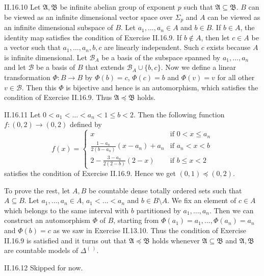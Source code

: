 \documentclass[12pt]{article}
\begin{document}
\begin{customthm}{II.16.10}
  Let $\mathfrak{A},\mathfrak{B}$ be infinite abelian group of exponent $p$ such that $\mathfrak{A}\subseteq\mathfrak{B}$. $B$ can be viewed as an infinite dimensional vector space over $\Sigma_p$ and $A$ can be viewed as an infinite dimensional subspace of $B$. Let $a_1,\ldots,a_n\in A$ and $b\in B$. If $b\in A$, the identity map satisfies the condition of Exercise II.16.9. If $b\not\in A$, then let $c\in A$ be a vector such that $a_1,\ldots,a_n,b,c$ are linearly independent. Such $c$ exists because $A$ is infinite dimensional. Let $\mathcal{B}_A$ be a basis of the subspace spanned by $a_1,\ldots,a_n$ and let $\mathcal{B}$ be a basis of $B$ that extends $\mathcal{B}_A\cup\{b,c\}$. Now we define a linear transformation $\Phi:B\rightarrow B$ by $\Phi(b)=c$, $\Phi(c)=b$ and $\Phi(v)=v$ for all other $v\in\mathcal{B}$. Then this $\Phi$ is bijective and hence is an automorphism, which satisfies the condition of Exercise II.16.9. Thus $\mathfrak{A}\preccurlyeq\mathfrak{B}$ holds.
\end{customthm}

\begin{customthm}{II.16.11}
  Let $0<a_1<\ldots<a_n<1\leq b<2$. Then the following function $f:(0,2)\rightarrow(0,2)$ defined by
  \[
    f(x)=
    \begin{cases}
      x & \text{if } 0<x\leq a_n \\
      \frac{1-a_n}{2(b-a_n)}(x-a_n)+a_n & \text{if } a_n<x<b \\
      2-\frac{3-a_n}{2(2-b)}(2-x) & \text{if } b\leq x<2
    \end{cases}
  \]
  satisfies the condition of Exercise II.16.9. Hence we get $(0,1)\preccurlyeq(0,2)$.

  To prove the rest, let $A,B$ be countable dense totally ordered sets such that $A\subseteq B$. Let $a_1,\ldots,a_n\in A$, $a_1<\ldots<a_n$ and $b\in B\setminus A$. We fix an element of $c\in A$ which belongs to the same interval with $b$ partitioned by $a_1,\ldots,a_n$. Then we can construct an automorphism $\Phi$ of $B$, starting from $\Phi(a_1)=a_1,\ldots,\Phi(a_n)=a_n$ and $\Phi(b)=c$ as we saw in Exercise II.13.10. Thus the condition of Exercise II.16.9 is satisfied and it turns out that $\mathfrak{A}\preccurlyeq\mathfrak{B}$ holds whenever $\mathfrak{A}\subseteq\mathfrak{B}$ and $\mathfrak{A},\mathfrak{B}$ are countable models of $\Delta^{(~)}$.
\end{customthm}

\begin{customthm}{II.16.12}
  Skipped for now.
\end{customthm}
\end{document}
